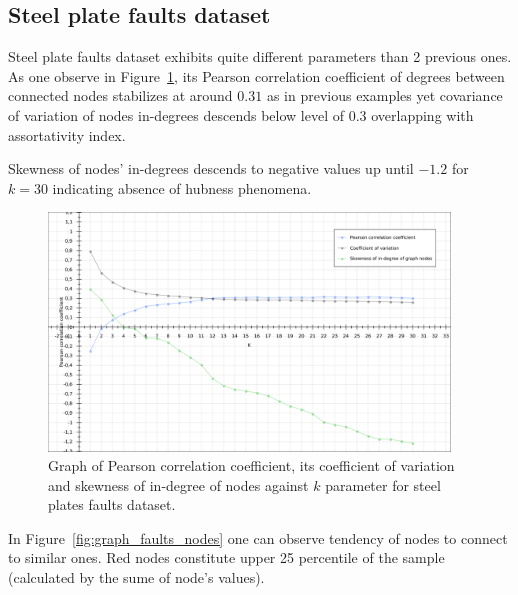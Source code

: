 \clearpage
\subsection{Steel plate faults dataset}
Steel plate faults dataset exhibits quite different parameters than 2 previous ones.
As one observe in Figure~\ref{fig:graph_faults_pearson}, its Pearson correlation coefficient of degrees between connected nodes stabilizes at around $0.31$ as in previous examples yet covariance of variation of nodes in-degrees descends below level of $0.3$ overlapping with assortativity index.

Skewness of nodes' in-degrees descends to negative values up until $-1.2$ for $k = 30$ indicating absence of hubness phenomena.

\begin{figure}[h!]
  \centering
  \captionsetup{justification=centering}
    \includegraphics[width=0.95\textwidth]{images/faults_pearson.png}
  \caption{Graph of Pearson correlation coefficient, its coefficient of variation and skewness of in-degree of nodes against $k$ parameter for steel plates faults dataset.}
  \label{fig:graph_faults_pearson}
\end{figure}


In Figure~\ref{fig:graph_faults_nodes} one can observe tendency of nodes to connect to similar ones.
Red nodes constitute upper 25 percentile of the sample (calculated by the sume of node's values).


